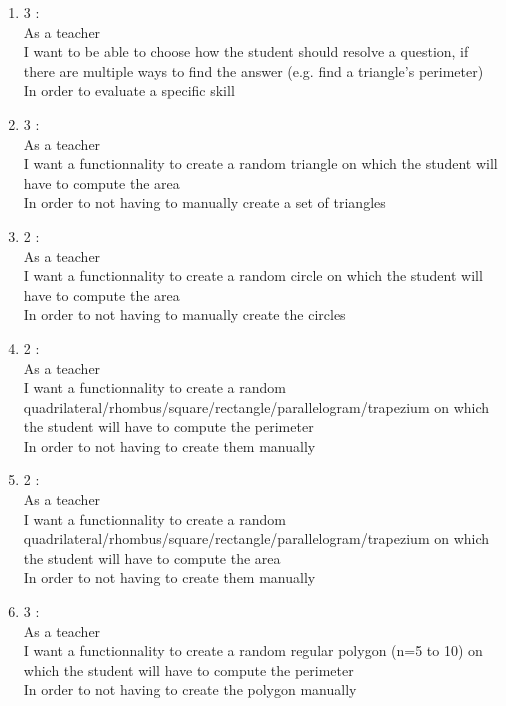 \documentclass{article}
\begin{document}
\begin{enumerate}
    \item 3 :\\
    As a teacher\\ %
    I want to be able to choose how the student should resolve a question, if there are multiple ways to find the answer (e.g. find a triangle's perimeter)\\
    In order to evaluate a specific skill\\

    \item 3 :\\
    As a teacher\\ %
    I want a functionnality to create a random triangle on which the student will have to compute the area\\
    In order to not having to manually create a set of triangles\\

    \item 2 :\\
    As a teacher\\ %
    I want a functionnality to create a random circle on which the student will have to compute the area\\
    In order to not having to manually create the circles\\

    \item 2 :\\
    As a teacher\\ %
    I want a functionnality to create a random quadrilateral/rhombus/square/rectangle/parallelogram/trapezium on which the student will have to compute the perimeter\\
    In order to not having to create them manually\\

    \item 2 :\\ %
    As a teacher\\
    I want a functionnality to create a random quadrilateral/rhombus/square/rectangle/parallelogram/trapezium on which the student will have to compute the area\\
    In order to not having to create them manually\\

    \item 3 :\\ %
    As a teacher\\
    I want a functionnality to create a random regular polygon (n=5 to 10) on which the student will have to compute the perimeter\\
    In order to not having to create the polygon manually\\


\end{enumerate}
\end{document}
